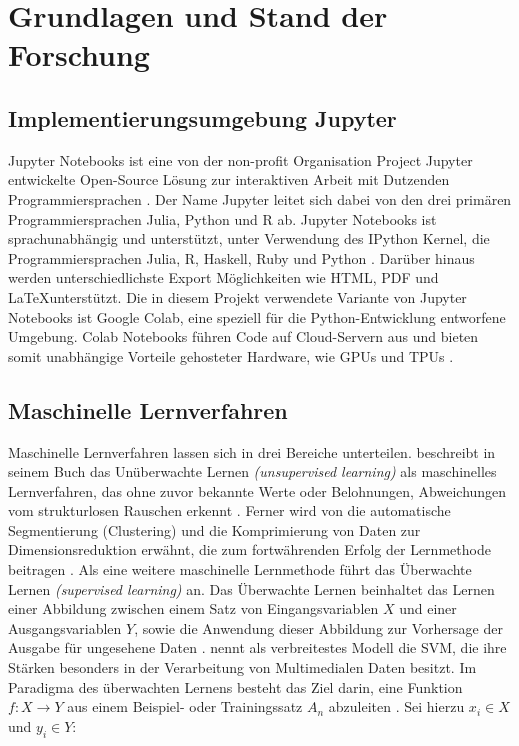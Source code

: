 \chapter{Grundlagen und Stand der Forschung}


\section{Implementierungsumgebung Jupyter}
\par
Jupyter Notebooks ist eine von der non-profit Organisation Project Jupyter entwickelte Open-Source Lösung zur interaktiven Arbeit mit Dutzenden Programmiersprachen \cite{project_jupyter}. Der Name Jupyter leitet sich dabei von den drei primären Programmiersprachen Julia, Python und R ab. Jupyter Notebooks ist sprachunabhängig und unterstützt, unter Verwendung des IPython \gls{Kernel}, die Programmiersprachen Julia, R, Haskell, Ruby und Python \cite{jupyter_kernel}. Darüber hinaus werden unterschiedlichste Export Möglichkeiten wie \ac{HTML}, \ac{PDF} und \LaTeX \space unterstützt. Die in diesem Projekt verwendete Variante von Jupyter Notebooks ist Google Colab, eine speziell für die Python-Entwicklung entworfene Umgebung. Colab Notebooks führen Code auf Cloud-Servern aus und bieten somit unabhängige Vorteile gehosteter Hardware, wie \acp{GPU} und \acp{TPU} \cite{colab_notebooks}.

\section{Maschinelle Lernverfahren}\label{sec:machine_learning}

Maschinelle Lernverfahren lassen sich in drei Bereiche unterteilen. \citeauthor{Sejnowski1999} beschreibt in seinem Buch  das Unüberwachte Lernen \emph{(unsupervised learning)} als maschinelles Lernverfahren, das ohne zuvor bekannte Werte oder Belohnungen, Abweichungen vom strukturlosen Rauschen erkennt \cite{Sejnowski1999}. Ferner wird von \citeauthor{duda1973pattern} die automatische Segmentierung (Clustering) und die Komprimierung von Daten zur Dimensionsreduktion erwähnt, die zum fortwährenden Erfolg der Lernmethode beitragen \cites[51\psq]{duda1973pattern}[51\psq]{Cord2008}. Als eine weitere maschinelle Lernmethode führt \citeauthor{Cord2008} das Überwachte Lernen \emph{(supervised learning)} an. Das Überwachte Lernen beinhaltet das Lernen einer Abbildung zwischen einem Satz von Eingangsvariablen $X$ und einer Ausgangsvariablen $Y$, sowie die Anwendung dieser Abbildung zur Vorhersage der Ausgabe für ungesehene Daten \cite[21\psqq]{Cord2008}. \citeauthor{Cord2008} nennt \citeyear{Cord2008} als verbreitestes Modell die \ac{SVM}, die ihre Stärken besonders in der Verarbeitung von Multimedialen Daten besitzt. Im Paradigma des überwachten Lernens besteht das Ziel darin, eine Funktion $f:X \longrightarrow Y$ aus einem Beispiel- oder Trainingssatz $A_{n}$ abzuleiten \cite[22]{Cord2008}. Sei hierzu $x_i \in X$ und $y_i \in Y$:

